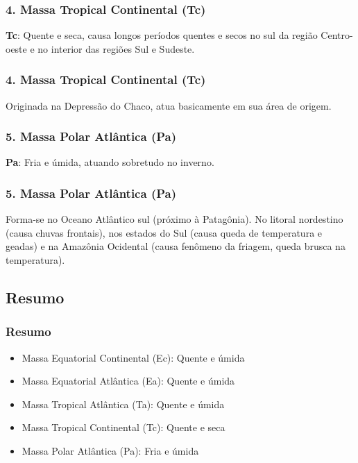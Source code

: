 \begin{frame}
  \frametitle{4. Massa Tropical Continental (Tc)}
  {\scriptsize
  \begin{block}{}
    {\bf Tc}: Quente e seca, causa longos períodos quentes e secos no sul da
    região Centro-oeste e no interior das regiões Sul e Sudeste.
  \end{block}
  }
  \begin{center}
  \end{center}
\end{frame}


\begin{frame}
  \frametitle{4. Massa Tropical Continental (Tc)}
  {\small
  \begin{block}{}
    Originada na Depressão do Chaco, atua basicamente em sua área de origem.
  \end{block}
  }
\end{frame}


\begin{frame}
  \frametitle{5. Massa Polar Atlântica (Pa)}
  {\scriptsize
  \begin{block}{}
    {\bf Pa}: Fria e úmida, atuando sobretudo no inverno.
  \end{block}
  }
  \begin{center}
  \end{center}
\end{frame}


\begin{frame}
  \frametitle{5. Massa Polar Atlântica (Pa)}
  {\small
  \begin{block}{}
    Forma-se no Oceano Atlântico sul (próximo à Patagônia).   No litoral
    nordestino (causa chuvas frontais), nos estados do Sul (causa queda de
    temperatura e geadas) e na Amazônia Ocidental (causa fenômeno da friagem,
    queda brusca na temperatura).
  \end{block}
  }
\end{frame}


\subsection{Resumo}
\begin{frame}
  \frametitle{Resumo}
  \begin{itemize}[<+-| alert@+>]
    \item Massa Equatorial Continental (Ec): Quente e úmida
    \item Massa Equatorial Atlântica (Ea): Quente e úmida
    \item Massa Tropical Atlântica (Ta): Quente e úmida
    \item Massa Tropical Continental (Tc): Quente e seca
    \item Massa Polar Atlântica (Pa): Fria e úmida
  \end{itemize}
\end{frame}


